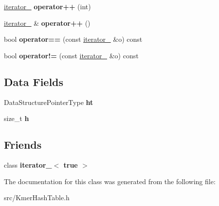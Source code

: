 \begin{DoxyCompactItemize}
\mbox{\label{classKmerHashTable_1_1iterator___a3b81b3b0988cba9a4fd1fb4758b155ed}} 
\hyperlink{classKmerHashTable_1_1iterator__}{iterator\+\_\+} {\bfseries operator++} (int)
\item 
\mbox{\label{classKmerHashTable_1_1iterator___af44261fb35b49bcb6058c0c29770fe3e}} 
\hyperlink{classKmerHashTable_1_1iterator__}{iterator\+\_\+} \& {\bfseries operator++} ()
\item 
\mbox{\label{classKmerHashTable_1_1iterator___a1c0b16af8aa50254a85982640e012779}} 
bool {\bfseries operator==} (const \hyperlink{classKmerHashTable_1_1iterator__}{iterator\+\_\+} \&o) const
\item 
\mbox{\label{classKmerHashTable_1_1iterator___a8f9bfbd3ae15c15e8e2b8b301c989689}} 
bool {\bfseries operator!=} (const \hyperlink{classKmerHashTable_1_1iterator__}{iterator\+\_\+} \&o) const
\end{DoxyCompactItemize}
\subsection*{Data Fields}
\begin{DoxyCompactItemize}
\item 
\mbox{\label{classKmerHashTable_1_1iterator___af84ec4b18382c9ae6186b98434c0f444}} 
Data\+Structure\+Pointer\+Type {\bfseries ht}
\item 
\mbox{\label{classKmerHashTable_1_1iterator___adf60099b2b2301251702ba0a3aacf972}} 
size\+\_\+t {\bfseries h}
\end{DoxyCompactItemize}
\subsection*{Friends}
\begin{DoxyCompactItemize}
\item 
\mbox{\label{classKmerHashTable_1_1iterator___a97892b3c6f1f1c933ebed425135d20cb}} 
class {\bfseries iterator\+\_\+$<$ true $>$}
\end{DoxyCompactItemize}


The documentation for this class was generated from the following file\+:\begin{DoxyCompactItemize}
\item 
src/Kmer\+Hash\+Table.\+h\end{DoxyCompactItemize}
